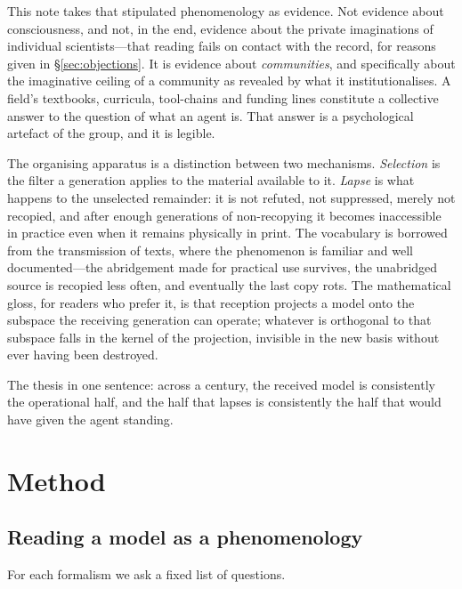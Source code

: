 \documentclass[11pt,a4paper]{article}
\begin{document}
This note takes that stipulated phenomenology as evidence. Not evidence about
consciousness, and not, in the end, evidence about the private imaginations of
individual scientists---that reading fails on contact with the record, for
reasons given in \S\ref{sec:objections}. It is evidence about \emph{communities},
and specifically about the imaginative ceiling of a community as revealed by what
it institutionalises. A field's textbooks, curricula, tool-chains and funding
lines constitute a collective answer to the question of what an agent is. That
answer is a psychological artefact of the group, and it is legible.

The organising apparatus is a distinction between two mechanisms. \emph{Selection}
is the filter a generation applies to the material available to it. \emph{Lapse}
is what happens to the unselected remainder: it is not refuted, not suppressed,
merely not recopied, and after enough generations of non-recopying it becomes
inaccessible in practice even when it remains physically in print. The vocabulary
is borrowed from the transmission of texts, where the phenomenon is familiar and
well documented---the abridgement made for practical use survives, the
unabridged source is recopied less often, and eventually the last copy rots. The
mathematical gloss, for readers who prefer it, is that reception projects a model
onto the subspace the receiving generation can operate; whatever is orthogonal to
that subspace falls in the kernel of the projection, invisible in the new basis
without ever having been destroyed.

The thesis in one sentence: across a century, the received model is consistently
the operational half, and the half that lapses is consistently the half that
would have given the agent standing.

\section{Method}
\label{sec:method}

\subsection{Reading a model as a phenomenology}

For each formalism we ask a fixed list of questions.
\end{document}

